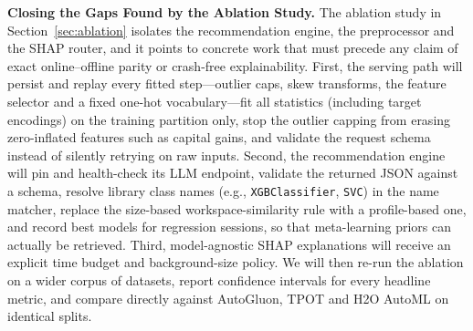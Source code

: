 \textbf{Closing the Gaps Found by the Ablation Study.} The ablation study in Section~\ref{sec:ablation} isolates the recommendation engine, the preprocessor and the SHAP router, and it points to concrete work that must precede any claim of exact online--offline parity or crash-free explainability. First, the serving path will persist and replay every fitted step---outlier caps, skew transforms, the feature selector and a fixed one-hot vocabulary---fit all statistics (including target encodings) on the training partition only, stop the outlier capping from erasing zero-inflated features such as capital gains, and validate the request schema instead of silently retrying on raw inputs. Second, the recommendation engine will pin and health-check its LLM endpoint, validate the returned JSON against a schema, resolve library class names (e.g., \texttt{XGBClassifier}, \texttt{SVC}) in the name matcher, replace the size-based workspace-similarity rule with a profile-based one, and record best models for regression sessions, so that meta-learning priors can actually be retrieved. Third, model-agnostic SHAP explanations will receive an explicit time budget and background-size policy. We will then re-run the ablation on a wider corpus of datasets, report confidence intervals for every headline metric, and compare directly against AutoGluon, TPOT and H2O AutoML on identical splits.

